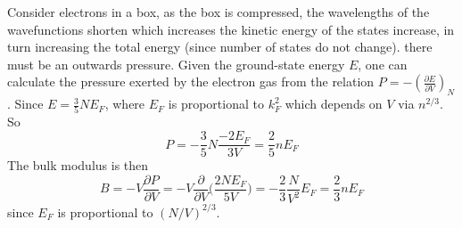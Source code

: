 \documentclass[a4paper]{article}
\begin{document}
\begin{center}
\end{center}
\begin{Note}
Consider electrons in a box, as the box is compressed, the wavelengths of the wavefunctions shorten which increases the kinetic energy of the states increase, in turn increasing the total energy (since number of states do not change). there must be an outwards pressure. Given the ground-state energy $E$, one can calculate the pressure exerted by the electron gas from the relation $P=-(\frac{\partial E}{\partial V})_N$. Since $E=\frac{3}{5}NE_F$, where $E_F$ is proportional to $k_F^2$ which depends on $V$ via $n^{2/3}$. So 
$$P=-\frac{3}{5}N\frac{-2E_F}{3V}=\frac{2}{5}nE_F$$
The bulk modulus is then
$$B=-V\frac{\partial P}{\partial V}=-V\frac{\partial}{\partial V}\bigg(\frac{2NE_F}{5V}\bigg)=-\frac{2}{3}\frac{N}{V^2}E_F=\frac{2}{3}nE_F$$
since $E_F$ is proportional to $(N/V)^{2/3}$. 
\end{Note}
\end{document}
